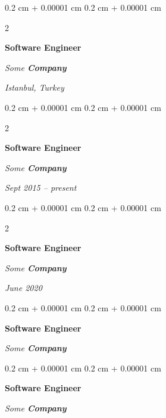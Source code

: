 \documentclass[10pt, letterpaper]{article}
\newenvironment{onecolentry}{
    \begin{adjustwidth}{
        0.2 cm + 0.00001 cm
    }{
        0.2 cm + 0.00001 cm
    }
}{
    \end{adjustwidth}
} %
\newenvironment{twocolentry}[2][]{
    \onecolentry
    \def\secondColumn{#2}
    \setcolumnwidth{\fill, 4.5 cm}
    \begin{paracol}{2}
}{
    \switchcolumn \raggedleft \secondColumn
    \end{paracol}
    \endonecolentry
} %
\begin{document}
        \vspace{0.2 cm}

        \begin{twocolentry}{
        \textit{Istanbul, Turkey}    
            
        }
            \textbf{Software Engineer}
            
            \textit{Some \textbf{Company}}
        \end{twocolentry}



        \vspace{0.2 cm}

        \begin{twocolentry}{
            
            
        \textit{Sept 2015 – present}}
            \textbf{Software Engineer}
            
            \textit{Some \textbf{Company}}
        \end{twocolentry}



        \vspace{0.2 cm}

        \begin{twocolentry}{
            
            
        \textit{June 2020}}
            \textbf{Software Engineer}
            
            \textit{Some \textbf{Company}}
        \end{twocolentry}



        \vspace{0.2 cm}

        \begin{onecolentry}
            \textbf{Software Engineer}
            
            \textit{Some \textbf{Company}}
        \end{onecolentry}



        \vspace{0.2 cm}

        \begin{onecolentry}
            \textbf{Software Engineer}
            
            \textit{Some \textbf{Company}}
        \end{onecolentry}
\end{document}
